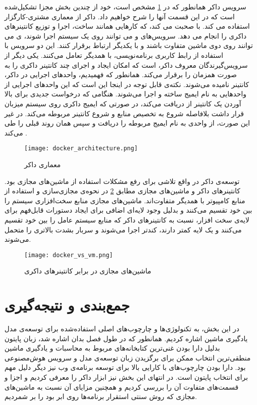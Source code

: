 سرویس داکر همانطور که در \cref{fig:docker_architecture} مشخص است، خود از چندین بخش مجزا تشکیل‌شده است که در این قسمت آنها را شرح 
خواهیم داد. داکر از معماری مشتری-کارگزار استفاده می کند.  با  صحبت می کند، که کارهایی همانند ساخت، اجرا و توزیع کانتینرهای داکری را انجام می دهد. سرویس‌های  و  می توانند روی یک سیستم اجرا شوند، ی می توانند روی دوی ماشین متفاوت باشند و با یکدیگر ارتباط برقرار کنند. این دو سرویس با استفاده از رابط کاربری برنامه‌نویسی، با همدیگر تعامل می‌کنند. یکی دیگر از سرویس‌گیرندگان معروف داکر،  است که امکان ایجاد و اجرای چند کانتینر داکری را به صورت همزمان را برقرار می‌کند. همانطور که فهمیدیم، واحد‌های اجرایی در داکر، کانتینر نامیده می‌شوند. نکته‌ی قابل توجه در اینجا این است که این واحد‌های اجرایی از واحد‌هایی به نام ایمیج ساخته و اجرا می‌شوند. هنگامی که  درخواست جدیدی برای بالا آوردن یک کانتینر از  دریافت می‌کند، در صورتی که ایمیج داکری روی سیستم میزبان قرار داشت بلافاصله شروع به تخصیص منابع و شروع کانتینر مربوطه می‌کند. در غیر این صورت، از واحدی به نام  ایمیج مربوطه را دریافت و سپس همان روند قبلی را طی می‌کند \cite{dockerDockerOverview}.

\begin{figure}[!h]
\centerline{\texttt{[image: docker\_architecture.png]}}
\caption{معماری داکر\cite{dockerDockerOverview}}
\label{fig:docker_architecture}
\end{figure}

توسعه‌ی داکر در واقع تلاشی برای رفع مشکلات استفاده از ماشین‌های مجازی بود. کانتینرهای داکر و ماشین‌های مجازی مطابق \cref{fig:docker_vs_vm} در نحوه‌ی مجازی‌سازی و استفاده از منابع کامپیوتر با همدیگر متفاوت‌اند. ماشین‌های مجازی منابع سخت‌افزاری سیستم را بین خود تقسیم می‌کنند و بدلیل وجود لایه‌ای اضافی برای ایجاد دستورات قابل‌فهم برای لایه‌ی سخت افزار، نسبت به کانتینرهای داکر که منابع سیستم عامل را بین خود تقسیم می‌کنند و یک لایه کمتر دارند، کندتر اجرا می‌شوند و سربار بشدت بالاتری را متحمل می‌شوند\cite{anderson2015docker, yadav2019docker}.

\begin{figure}[!h]
\centerline{\texttt{[image: docker\_vs\_vm.png]}}
\caption{ماشین‌های مجازی در برابر کانتینرهای داکری\cite{yadav2019docker}}
\label{fig:docker_vs_vm}
\end{figure}

\section{جمع‌بندی و نتیجه‌گیری}
در این بخش، به تکنولوژی‌ها و چارچوب‌های اصلی استفاده‌شده برای توسعه‌ی مدل یادگیری ماشین اشاره کردیم. همانطور که در طول فصل بدان اشاره شد، زبان پایتون بدلیل دارا بودن غنی‌ترین کتابخانه‌های مربوط به محاسبات و یادگیری ماشین منطقی‌ترین انتخاب ممکن برای برگزیدن زبان توسعه‌ی مدل و سرویس هوش‌مصنوعی بود. دارا بودن چارچوب‌های با کارایی بالا برای توسعه برنامه‌ی وب نیز دیگر دلیل مهم برای انتخاب پایتون است. در انتهای این بخش نیز ابزار داکر را معرفی کردیم و اجزا و قسمت‌های متفاوت آن را بررسی کردیم و همچنین مزایای آن نسبت به ماشین‌های مجازی که روش سنتی استقرار برنامه‌ها روی ابر بود را بر شمردیم.  